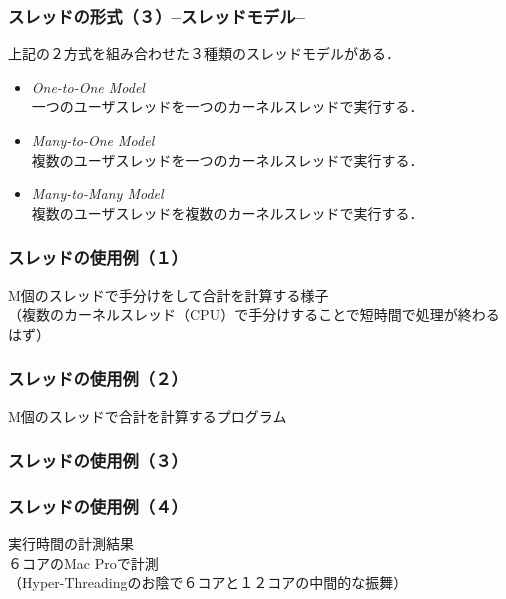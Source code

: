 \documentclass[unicode]{beamer}                   %
\begin{document}
\begin{frame}
  \frametitle{スレッドの形式（３）--スレッドモデル--}
  上記の２方式を組み合わせた３種類のスレッドモデルがある．
  \vfill
  \begin{itemize}
  \item \emph{One-to-One Model}   \\
    一つのユーザスレッドを一つのカーネルスレッドで実行する．
  \item \emph{Many-to-One Model}  \\
    複数のユーザスレッドを一つのカーネルスレッドで実行する．
  \item \emph{Many-to-Many Model} \\
    複数のユーザスレッドを複数のカーネルスレッドで実行する．
  \end{itemize}
  \vfill
\end{frame}

\begin{frame}
  \frametitle{スレッドの使用例（１）}
  M個のスレッドで手分けをして合計を計算する様子 \\
  （複数のカーネルスレッド（CPU）で手分けすることで短時間で処理が終わるはず）
  \vfill
\end{frame}

\begin{frame}[fragile]
  \frametitle{スレッドの使用例（２）}
  M個のスレッドで合計を計算するプログラム \\
  \vfill
\end{frame}

\begin{frame}[fragile]
  \frametitle{スレッドの使用例（３）}
\end{frame}

\begin{frame}[fragile]
  \frametitle{スレッドの使用例（４）}
  実行時間の計測結果 \\
  \vfill
  \vfill
  \vfill
  ６コアのMac Proで計測\\
  （Hyper-Threadingのお陰で６コアと１２コアの中間的な振舞）
  \vfill
\end{frame}
\end{document}

